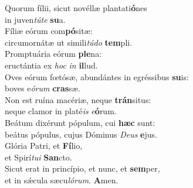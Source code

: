 \oddverse Quorum fílii, sicut novéllæ plantati\textbf{ó}nes~\*\\
\oddverse in juven\textit{tú}\textit{te} \textbf{su}a.\\
\evenverse Fíliæ eórum com\textbf{pó}sitæ:~\*\\
\evenverse circumornátæ ut simili\textit{tú}\textit{do} \textbf{tem}pli.\\
\oddverse Promptuária eórum \textbf{ple}na:~\*\\
\oddverse eructántia ex \textit{hoc} \textit{in} \textbf{il}lud.\\
\evenverse Oves eórum fœtósæ, abundántes in egréssibus \textbf{su}is:~\*\\
\evenverse boves e\textit{ó}\textit{rum} \textbf{cras}sæ.\\
\oddverse Non est ruína macériæ, neque \textbf{trán}situs:~\*\\
\oddverse neque clamor in platé\textit{is} \textit{e}\textbf{ó}rum.\\
\evenverse Beátum dixérunt pópulum, cui \textbf{hæc} sunt:~\*\\
\evenverse beátus pópulus, cujus Dóminus \textit{De}\textit{us} \textbf{e}jus.\\
\oddverse Glória Patri, et \textbf{Fí}lio,~\*\\
\oddverse et Spirí\textit{tu}\textit{i} \textbf{San}cto.\\
\evenverse Sicut erat in princípio, et nunc, et \textbf{sem}per,~\*\\
\evenverse et in sǽcula sæcu\textit{ló}\textit{rum}. \textbf{A}men.\\
